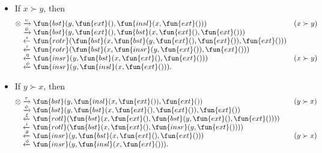 \begin{itemize}

  \item If \(x \succ y\), then
\begin{equation*}
\begin{array}{@{}r@{\;}l@{\;}l@{\quad}r@{}}
\otimes
& \xrightarrow{\smash{\upsilon}} &
  \fun{bst}(y,\fun{ext}(),\fun{insl}(x,\fun{ext}()))
& (x \succ y)\\
& \xrightarrow{\smash{\phi}} &
  \fun{bst}(y,\fun{ext}(),\fun{bst}(x,\fun{ext}(),\fun{ext}()))\\
& \xleftarrow{\smash{\epsilon}} &
\fun{rotr}(\fun{bst}(x,\fun{bst}(y,\fun{ext}(),\fun{ext}()),\fun{ext}()))\\
& \xleftarrow{\smash{\iota}} &
  \fun{rotr}(\fun{bst}(x,\fun{insr}(y,\fun{ext}()),\fun{ext}()))\\
& \xleftarrow{\smash{\eta}} &
  \fun{insr}(y,\fun{bst}(x,\fun{ext}(),\fun{ext}()))
& (x \succ y)\\
& \xleftarrow{\smash{\phi}} &
  \fun{insr}(y,\fun{insl}(x,\fun{ext}())).
\end{array}
\end{equation*}

  \item If \(y \succ x\), then
\begin{equation*}
\begin{array}{@{}r@{\;}l@{\;}l@{\qquad}r@{}}
\otimes & \xrightarrow{\smash{\tau}} &
  \fun{bst}(y,\fun{insl}(x,\fun{ext}()),\fun{ext}())
& (y \succ x)\\
& \xrightarrow{\smash{\phi}} &
  \fun{bst}(y,\fun{bst}(x,\fun{ext}(),\fun{ext}()),\fun{ext}())\\
& \xleftarrow{\smash{\xi}} &
\fun{rotl}(\fun{bst}(x,\fun{ext}(),\fun{bst}(y,\fun{ext}(),\fun{ext}())))\\
& \xleftarrow{\smash{\iota}} &
  \fun{rotl}(\fun{bst}(x,\fun{ext}(),\fun{insr}(y,\fun{ext}())))\\
& \xleftarrow{\smash{\theta}} &
  \fun{insr}(y,\fun{bst}(x,\fun{ext}(),\fun{ext}()))
& (y \succ x)\\
& \xleftarrow{\smash{\phi}} &
  \fun{insr}(y,\fun{insl}(x,\fun{ext}())).
\end{array}
\end{equation*}
\end{itemize}


